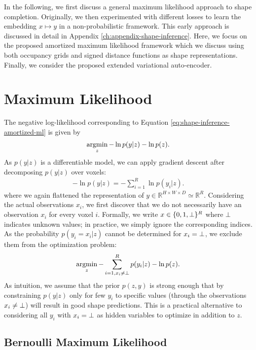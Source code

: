 In the following, we first discuss a general maximum likelihood approach
to shape completion. Originally, we then experimented with different losses
to learn the embedding $x \mapsto y$ in a non-probabilistic framework. This early
approach is discussed in detail in Appendix \ref{ch:appendix-shape-inference}.
Here, we focus on the proposed amortized maximum likelihood framework which
we discuss using both occupancy grids and signed distance functions
as shape representations. Finally, we consider the proposed extended variational
auto-encoder.

\section{Maximum Likelihood}
\label{sec:shape-inference-maximum-likelihood}

The negative log-likelihood corresponding to Equation
\eqref{eq:shape-inference-amortized-ml} is given by
\begin{align}
  \operatorname*{argmin}_{z} - \ln p(y | z) - \ln p(z).\label{eq:shape-inference-nn-ml}
\end{align}
As $p(y | z)$ is a differentiable model,
we can apply gradient descent after decomposing $p(y | z)$ over voxels:
\begin{align}
  - \ln p(y | z) = - \sum_{i = 1}^R \ln p(y_i | z).
\end{align}
where we again flattened the representation of
$y \in \mathbb{R}^{H \times W \times D} \simeq \mathbb{R}^R$.
Considering the actual observations $x_i$, we first discover that
we do not necessarily have an observation $x_i$ for every voxel $i$.
Formally, we write $x \in \{0,1,\bot\}^R$ where $\bot$ indicates
unknown values; in practice, we simply ignore the corresponding indices.
As the probability $p(y_i = x_i | z)$ cannot be determined for $x_i = \bot$,
we exclude them from the optimization problem:
\begin{align}
  \operatorname*{argmin}_{z} - \sum_{i = 1, x_i \neq \bot}^R p(y_i | z) - \ln p(z).
\end{align}
As intuition, we assume that the prior $p(z, y)$ is strong enough that
by constraining $p(y | z)$ only for few $y_i$ to specific values (through the
observations $x_i \neq \bot$) will result in good shape predictions.
This is a practical alternative to considering all
$y_i$ with $x_i = \bot$ as hidden variables to optimize in addition to $z$.

\subsection{Bernoulli Maximum Likelihood}

